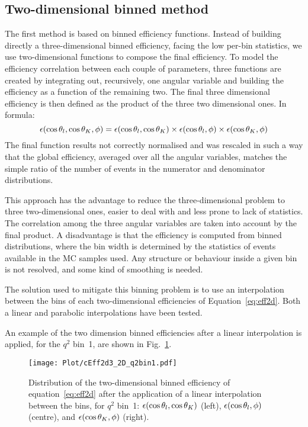 \subsection{Two-dimensional binned method}\label{sec:eff_2Dprod}
The first method is based on binned efficiency functions.
Instead of building directly a three-dimensional binned efficiency, facing the low per-bin statistics, we use two-dimensional functions to compose the final efficiency.
To model the efficiency correlation between each couple of parameters, three functions are created by integrating out, recursively, one angular variable and building the efficiency as a function of the remaining two.
The final three dimensional efficiency is then defined as the product of the three two dimensional ones.
In formula:
\begin{equation}\label{eq:eff2d}
    \epsilon(\cos\theta_l,\cos\theta_K,\phi)=\epsilon(\cos\theta_l,\cos\theta_K)\times\epsilon(\cos\theta_l,\phi)\times\epsilon(\cos\theta_K,\phi)
\end{equation}
The final function results not correctly normalised and was rescaled in such a way that the global efficiency, averaged over all the angular variables, matches the simple ratio of the number of events in the numerator and denominator distributions.

This approach has the advantage to reduce the three-dimensional problem to three two-dimensional ones, easier to deal with and less prone to lack of statistics.
The correlation among the three angular variables are taken into account by the final product.
A disadvantage is that the efficiency is computed from binned distributions, where the bin width is determined by the statistics of events available in the MC samples used.
Any structure or behaviour inside a given bin is not resolved, and some kind of smoothing is needed.

The solution used to mitigate this binning problem is to use an interpolation between the bins of each two-dimensional efficiencies of Equation~\ref{eq:eff2d}.
Both a linear and parabolic interpolations have been tested.

An example of the two dimension binned efficiencies after a linear interpolation is applied, for the $q^2$ bin~1, are shown in Fig.~\ref{fig:eff2D}.

\begin{figure}[hbt]
    \texttt{[image: Plot/cEff2d3\_2D\_q2bin1.pdf]}
    \caption{Distribution of the two-dimensional binned efficiency of equation~\ref{eq:eff2d} after the application of a linear interpolation between the bins, for $q^2$ bin~1: $\epsilon(\cos\theta_l,\cos\theta_K)$ (left), $\epsilon(\cos\theta_l,\phi)$ (centre), and $\epsilon(\cos\theta_K,\phi)$ (right).}
    \label{fig:eff2D}
\end{figure}

